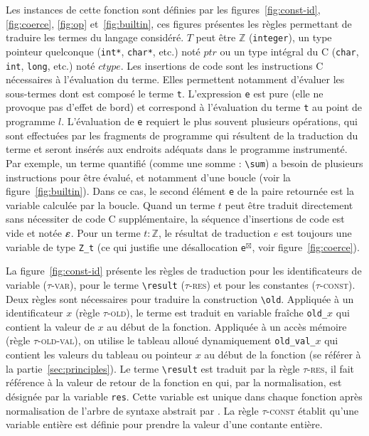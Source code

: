 Les instances de cette fonction sont définies par les
figures~\ref{fig:const-id}, \ref{fig:coerce}, \ref{fig:op} et~\ref{fig:builtin},
ces figures présentes les règles permettant de traduire les termes du langage
\eacsl considéré.
$T$ peut être $\mathbb{Z}$ (\lstinline'integer'), un type pointeur quelconque
(\lstinline'int*', \lstinline'char*', etc.) noté $ptr$ ou un type intégral du C
(\lstinline'char', \lstinline'int', \lstinline'long', etc.) noté $ctype$.
Les insertions de code sont les instructions C nécessaires à l'évaluation du
terme.
Elles permettent notamment d'évaluer les sous-termes dont est composé le terme
\lstinline't'.
L'expression \lstinline'e' est pure (elle ne provoque pas d'effet de bord) et
correspond à l'évaluation du terme \lstinline't' au point de programme $l$.
L'évaluation de \lstinline'e' requiert le plus souvent plusieurs opérations,
qui sont effectuées par les fragments de programme qui résultent de la
traduction du terme et seront insérés aux endroits adéquats dans le programme
instrumenté.
Par exemple, un terme quantifié (comme une somme : \lstinline'\sum') a besoin de
plusieurs instructions pour être évalué, et notamment d'une boucle (voir la
figure~\ref{fig:builtin}).
Dans ce cas, le second élément \lstinline'e' de la paire retournée est la
variable calculée par la boucle.
Quand un terme $t$ peut être traduit directement sans nécessiter de code C
supplémentaire, la séquence d'insertions de code est vide et notée $\varepsilon$.
Pour un terme $t:\mathbb{Z}$, le résultat de traduction $e$ est toujours une
variable de type \lstinline'Z_t' (ce qui justifie une désallocation
\lstinline{e}${}^{\boxtimes}$, voir figure~\ref{fig:coerce}).



La figure~\ref{fig:const-id} présente les règles de traduction pour les
identificateurs de variable (\textsc{$\tau$-var}), pour le terme
\lstinline'\result' (\textsc{$\tau$-res}) et pour les constantes
(\textsc{$\tau$-const}).
Deux règles sont nécessaires pour traduire la construction \eacsl
\lstinline'\old'.
Appliquée à un identificateur $x$ (règle \textsc{$\tau$-old}), le terme est
traduit en variable fraîche \lstinline'old_'$x$ qui contient la valeur de $x$ au
début de la fonction.
Appliquée à un accès mémoire (règle \textsc{$\tau$-old-val}), on utilise le
tableau alloué dynamiquement \lstinline'old_val_'$x$ qui contient les valeurs du
tableau ou pointeur $x$ au début de la fonction (se référer à la
partie~\ref{sec:principles}).
Le terme \lstinline'\result' est traduit par la règle \textsc{$\tau$-res}, il
fait référence à la valeur de retour de la fonction en \eacsl qui, par la
normalisation, est désignée par la variable \lstinline'res'.
Cette variable est unique dans chaque fonction après normalisation de l'arbre de
syntaxe abstrait par \framac.
La règle \textsc{$\tau$-const} établit qu'une variable entière est définie pour
prendre la valeur d'une contante entière.

